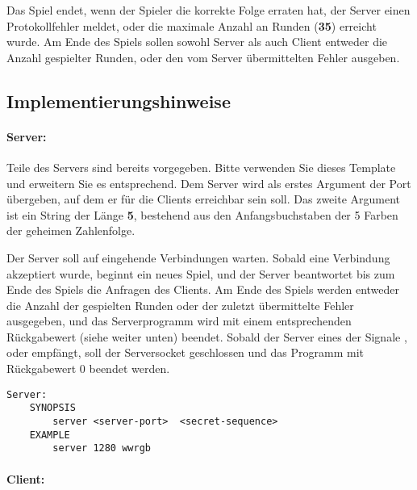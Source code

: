Das Spiel endet, wenn der Spieler die korrekte Folge erraten hat, der Server
einen Protokollfehler meldet, oder die maximale Anzahl an Runden (\textbf{35})
erreicht wurde. Am Ende des Spiels sollen sowohl Server als auch Client
entweder die Anzahl gespielter Runden, oder den vom Server übermittelten
Fehler ausgeben.

\subsection*{Implementierungshinweise}
\label{sec:implhints}
\paragraph{Server:}
Teile des Servers sind bereits vorgegeben. Bitte verwenden Sie dieses Template
und erweitern Sie es entsprechend.  Dem Server wird als erstes Argument der Port
übergeben, auf dem er für die Clients erreichbar sein soll. Das zweite Argument
ist ein String der Länge \textbf{5}, bestehend aus den Anfangsbuchstaben der 5
Farben der geheimen Zahlenfolge.


Der Server soll auf eingehende Verbindungen warten. Sobald eine Verbindung
akzeptiert wurde, beginnt ein neues Spiel, und der Server beantwortet bis zum
Ende des Spiels die Anfragen des Clients. Am Ende des Spiels werden entweder die
Anzahl der gespielten Runden oder der zuletzt übermittelte Fehler ausgegeben,
und das Serverprogramm wird mit einem entsprechenden Rückgabewert (siehe weiter
unten) beendet. Sobald der Server eines der Signale ,
 oder  empfängt, soll der Serversocket
geschlossen und das Programm mit Rückgabewert 0 beendet werden.

\begin{verbatim}
Server:
    SYNOPSIS
        server <server-port>  <secret-sequence>
    EXAMPLE
        server 1280 wwrgb
\end{verbatim}

\paragraph{Client:}

